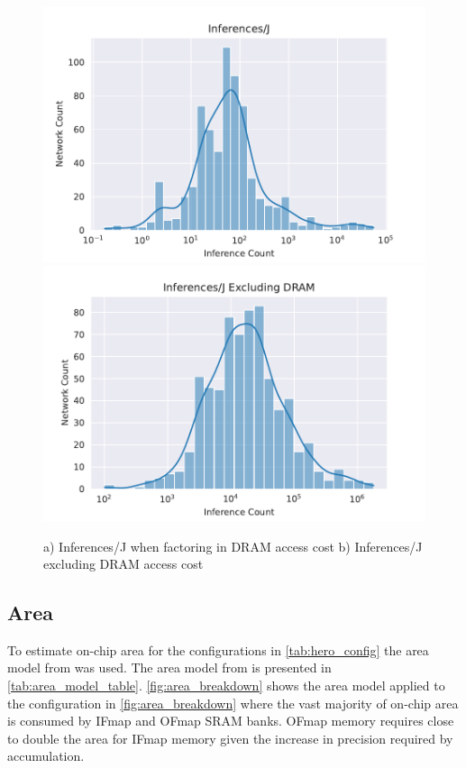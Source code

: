 \begin{figure}
    \centering
    \includegraphics[scale=0.48]{Plots/energy/inferences.pdf}
    \hspace{0.1cm} 
    \includegraphics[scale=0.48]{Plots/energy/inferences_wo_dram.pdf}
    \caption{a) Inferences/J when factoring in DRAM access cost b) Inferences/J excluding DRAM access cost}
    \label{fig:inferences_per_j}
\end{figure}

\subsection{Area}
\label{chap:hero:results:area}

To estimate on-chip area for the configurations in
\autoref{tab:hero_config} the area model from \cite{area_model} was used. The area
model from \cite{area_model} is presented in \autoref{tab:area_model_table}.
\autoref{fig:area_breakdown} shows the area model applied to the configuration
in \autoref{fig:area_breakdown} where the vast majority of on-chip area is
consumed by IFmap and OFmap SRAM banks. OFmap memory requires close to double
the area for IFmap memory given the increase in precision required by
accumulation.

